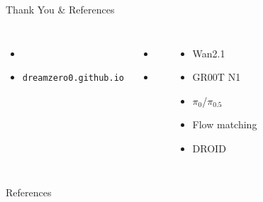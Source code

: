\begin{frame}{Thank You \& References}
\begin{columns}[T]
\begin{itemize}
    \item \citet{ye2026dreamzero}
    \item \texttt{dreamzero0.github.io}
\end{itemize}

\vspace{0.3em}
\begin{itemize}
    \item \citet{jang2026worldmodels}
    \item \citet{fan2026secondparadigm}
\end{itemize}

\begin{itemize}
    \item Wan2.1 \citep{wan2025wan}
    \item GR00T N1 \citep{bjorck2025gr00t}
    \item $\pi_0$/$\pi_{0.5}$
          \citep{black2024pi0,intelligence2025pi05}
    \item Flow matching \citep{liu2022flow,lipman2022flow}
    \item DROID \citep{khazatsky2024droid}
\end{itemize}
\end{columns}

\vspace{0.5em}
\begin{center}
\Large{}
\end{center}
\end{frame}

\begin{frame}[allowframebreaks]{References}
\printbibliography[heading=none]
\end{frame}



